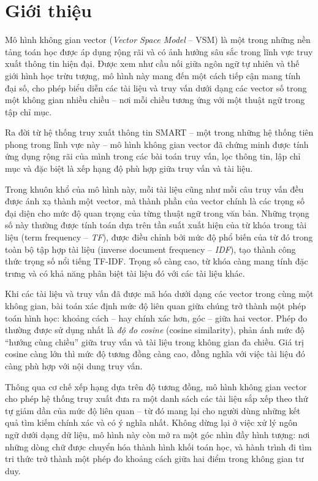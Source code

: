\section{Giới thiệu}
Mô hình không gian vector (\textit{Vector Space Model} -- VSM) là một trong những nền tảng toán học được áp dụng rộng rãi và có ảnh hưởng sâu sắc trong lĩnh vực truy xuất thông tin hiện đại. Được xem như cầu nối giữa ngôn ngữ tự nhiên và thế giới hình học trừu tượng, mô hình này mang đến một cách tiếp cận mang tính đại số, cho phép biểu diễn các tài liệu và truy vấn dưới dạng các vector số trong một không gian nhiều chiều -- nơi mỗi chiều tương ứng với một thuật ngữ trong tập chỉ mục.

Ra đời từ hệ thống truy xuất thông tin SMART -- một trong những hệ thống tiên phong trong lĩnh vực này -- mô hình không gian vector đã chứng minh được tính ứng dụng rộng rãi của mình trong các bài toán truy vấn, lọc thông tin, lập chỉ mục và đặc biệt là xếp hạng độ phù hợp giữa truy vấn và tài liệu.

Trong khuôn khổ của mô hình này, mỗi tài liệu cũng như mỗi câu truy vấn đều được ánh xạ thành một vector, mà thành phần của vector chính là các trọng số đại diện cho mức độ quan trọng của từng thuật ngữ trong văn bản. Những trọng số này thường được tính toán dựa trên tần suất xuất hiện của từ khóa trong tài liệu (term frequency -- \textit{TF}), được điều chỉnh bởi mức độ phổ biến của từ đó trong toàn bộ tập hợp tài liệu (inverse document frequency -- \textit{IDF}), tạo thành công thức trọng số nổi tiếng TF-IDF. Trọng số càng cao, từ khóa càng mang tính đặc trưng và có khả năng phân biệt tài liệu đó với các tài liệu khác.

Khi các tài liệu và truy vấn đã được mã hóa dưới dạng các vector trong cùng một không gian, bài toán xác định mức độ liên quan giữa chúng trở thành một phép toán hình học: khoảng cách -- hay chính xác hơn, góc -- giữa hai vector. Phép đo thường được sử dụng nhất là \textit{độ đo cosine} (cosine similarity), phản ánh mức độ ``hướng cùng chiều'' giữa truy vấn và tài liệu trong không gian đa chiều. Giá trị cosine càng lớn thì mức độ tương đồng càng cao, đồng nghĩa với việc tài liệu đó càng phù hợp với nội dung truy vấn.

Thông qua cơ chế xếp hạng dựa trên độ tương đồng, mô hình không gian vector cho phép hệ thống truy xuất đưa ra một danh sách các tài liệu sắp xếp theo thứ tự giảm dần của mức độ liên quan -- từ đó mang lại cho người dùng những kết quả tìm kiếm chính xác và có ý nghĩa nhất. Không dừng lại ở việc xử lý ngôn ngữ dưới dạng dữ liệu, mô hình này còn mở ra một góc nhìn đầy hình tượng: nơi những dòng chữ được chuyển hóa thành hình khối toán học, và hành trình đi tìm tri thức trở thành một phép đo khoảng cách giữa hai điểm trong không gian tư duy.
